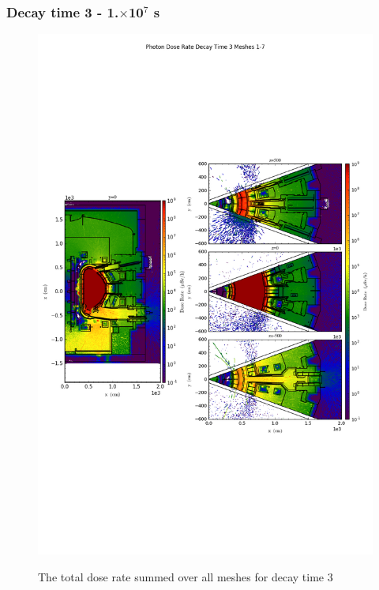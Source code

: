 \documentclass[12pt]{article}
\begin{document}
\subsubsection{Decay time 3 - 1.$\times$10$^7$ s}
\begin{figure}[ht!]
\centering
\includegraphics[trim={0cm 9cm 0cm 10cm},clip,scale=0.75]{../plots/final_model_nob4c/Photon_Dose_Rate_Decay_Time_3_Meshes_1-7.png}
\label{fig:photons_dc3_no4bc_total}
\caption{The total dose rate summed over all meshes for decay time 3}
\end{figure}
\end{document}
